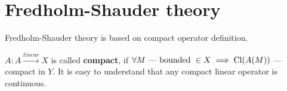 \section{Fredholm-Shauder theory}
Fredholm-Shauder theory is based on compact operator definition.
\begin{defn}
  $A \colon A \xrightarrow{linear} X$ is called \textbf{compact}, if $\forall M 
  \text{ --- bounded } \in X \implies \operatorname{Cl}({A(M)})$ --- compact in $Y$. It is easy to understand that any
  compact linear operator is continuous.
\end{defn}